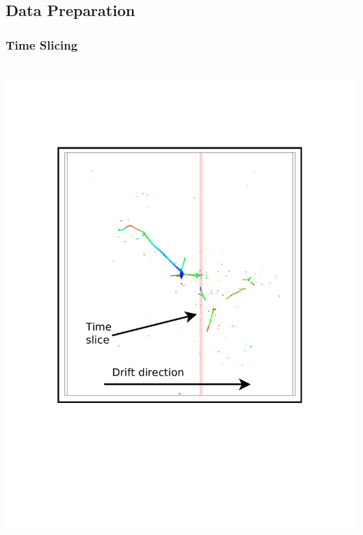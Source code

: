 \subsection{Data Preparation}


\begin{frame}[fragile]
  \frametitle{Time Slicing}
  
  \begin{columns}
    \begin{column}{0.35\textwidth}
      \begin{center}
        \vspace{-.5cm}

        \includegraphics[width=\textwidth]{slice.pdf}

        \vspace{-2cm}


\end{center}
\end{column}
\end{columns}
\end{frame}
